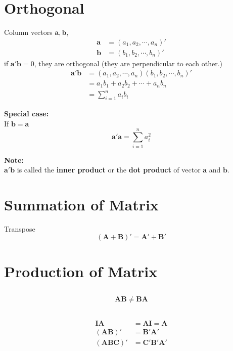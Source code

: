 \documentclass[12pt]{article}
\title{}
\author{}
\date{}
\begin{document}
\section{Orthogonal}

Column vectors $ \bm{a}, \bm{b} $, 
\begin{align*}
\bm{a} &= (a_1, a_2, \cdots, a_{n})'\\
\bm{b} &= (b_1, b_2, \cdots, b_{n})'
\end{align*}
if $ \bm{a}'\bm{b} = 0 $, they are orthogonal (they are perpendicular to each other.)
\begin{align*}
\bm{a}'\bm{b}&= (a_1, a_2, \cdots, a_{n})(b_1, b_2, \cdots, b_{n})'\\
&= a_1b_1 + a_2b_2 + \cdots + a_{n}b_{n}\\
&= \sum\limits_{i = 1} ^n a_{i}b_{i}	
\end{align*}

{\textbf {Special case:}}\\
If $ \bm{b} = \bm{a} $
\begin{equation*}
\bm{a}'\bm{a} = \sum\limits_{i = 1} ^n a_{i}^{2}	
\end{equation*}

{\textbf {Note:}}\\
$ \bm{a}'\bm{b} $ is called the {\textbf {inner product}} or the
{\textbf {dot product}} of vector $ \bm{a}  $ and $ \bm{b} $.







\section{Summation of Matrix}
Transpose
\begin{equation*}
(\bm{A} + \bm{B})' = \bm{A}' + \bm{B}'
\end{equation*}


\section{Production of Matrix}
\subsection{}
\begin{equation*}
\bm{AB} \ne \bm{BA}
\end{equation*}

\subsection{}
\begin{align*}
\bm{IA}&= \bm{AI} = \bm{A}\\
(\bm{AB})' &= \bm{B}'\bm{A}'\\
(\bm{ABC})' &= \bm{C}'\bm{B}'\bm{A}'
\end{align*}
\end{document}
